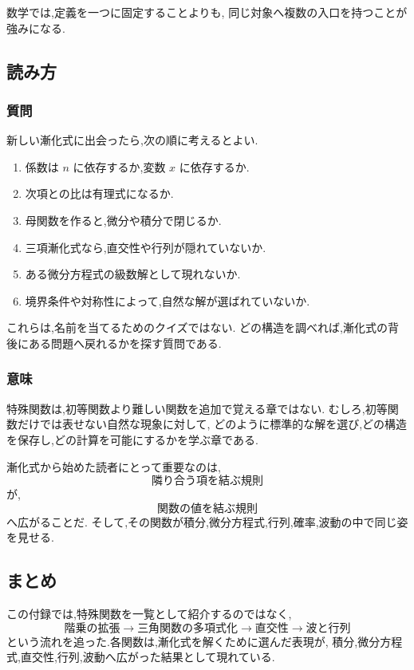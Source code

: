 数学では,定義を一つに固定することよりも,
同じ対象へ複数の入口を持つことが強みになる.

\subsection{読み方}

\subsubsection{質問}

新しい漸化式に出会ったら,次の順に考えるとよい.

\begin{enumerate}
  \item 係数は $n$ に依存するか,変数 $x$ に依存するか.
  \item 次項との比は有理式になるか.
  \item 母関数を作ると,微分や積分で閉じるか.
  \item 三項漸化式なら,直交性や行列が隠れていないか.
  \item ある微分方程式の級数解として現れないか.
  \item 境界条件や対称性によって,自然な解が選ばれていないか.
\end{enumerate}

これらは,名前を当てるためのクイズではない.
どの構造を調べれば,漸化式の背後にある問題へ戻れるかを探す質問である.

\subsubsection{意味}

特殊関数は,初等関数より難しい関数を追加で覚える章ではない.
むしろ,初等関数だけでは表せない自然な現象に対して,
どのように標準的な解を選び,どの構造を保存し,どの計算を可能にするかを学ぶ章である.

漸化式から始めた読者にとって重要なのは,
\[
  \text{隣り合う項を結ぶ規則}
\]
が,
\[
  \text{関数の値を結ぶ規則}
\]
へ広がることだ.
そして,その関数が積分,微分方程式,行列,確率,波動の中で同じ姿を見せる.

\subsection*{まとめ}

この付録では,特殊関数を一覧として紹介するのではなく,
\[
  \text{階乗の拡張}
  \longrightarrow
  \text{三角関数の多項式化}
  \longrightarrow
  \text{直交性}
  \longrightarrow
  \text{波と行列}
\]
という流れを追った.各関数は,漸化式を解くために選んだ表現が,
積分,微分方程式,直交性,行列,波動へ広がった結果として現れている.
